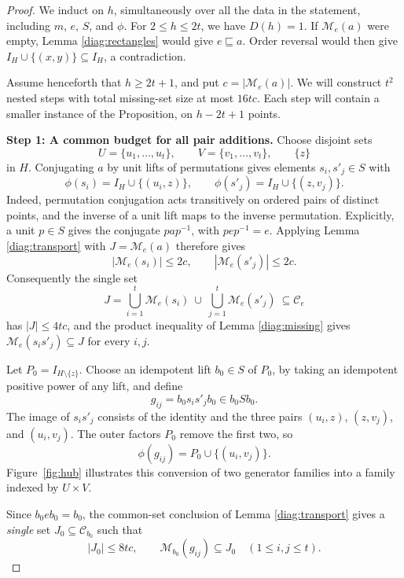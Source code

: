 \begin{proof}
We induct on $h$, simultaneously over all the data in the
statement, including $m$, $e$, $S$, and $\phi$.
For $2\leq h\leq2t$, we have $D(h)=1$.
If $\mathcal M_e(a)$ were empty, Lemma
\ref{diag:rectangles} would give $e\sqsubseteq a$.
Order reversal would then give
$I_H\cup\{(x,y)\}\subseteq I_H$, a contradiction.

Assume henceforth that $h\geq2t+1$, and put
$c=|\mathcal M_e(a)|$.  We will construct $t^2$ nested steps
with total missing-set size at most $16tc$.  Each step will
contain a smaller instance of the Proposition, on $h-2t+1$
points.

\medskip
\noindent\textbf{Step 1: A common budget for all pair additions.}
Choose disjoint sets
\[
 U=\{u_1,\ldots,u_t\},\qquad
 V=\{v_1,\ldots,v_t\},\qquad \{z\}
\]
in $H$.  Conjugating $a$ by unit lifts of permutations gives
elements $s_i,s'_j\in S$ with
\begin{equation}
 \phi(s_i)=I_H\cup\{(u_i,z)\},\qquad
 \phi(s'_j)=I_H\cup\{(z,v_j)\}.
 \label{amp:hub}
\end{equation}
Indeed, permutation conjugation acts transitively on ordered
pairs of distinct points, and the inverse of a unit lift maps
to the inverse permutation.  Explicitly, a unit $p\in S$
gives the conjugate $pap^{-1}$, with $pep^{-1}=e$.
Applying Lemma \ref{diag:transport} with
$J=\mathcal M_e(a)$ therefore gives
\[
 |\mathcal M_e(s_i)|\leq2c,\qquad
 |\mathcal M_e(s'_j)|\leq2c.
\]
Consequently the single set
\[
 J=\bigcup_{i=1}^t\mathcal M_e(s_i)
       \ \cup\ \bigcup_{j=1}^t\mathcal M_e(s'_j)
       \ \subseteq\mathcal C_e
\]
has $|J|\leq4tc$, and the product inequality of Lemma
\ref{diag:missing} gives
$\mathcal M_e(s_i s'_j)\subseteq J$ for every $i,j$.

Let $P_0=I_{H\setminus\{z\}}$.  Choose an idempotent lift
$b_0\in S$ of $P_0$, by taking an idempotent positive power
of any lift, and define
\[
 g_{ij}=b_0s_i s'_j b_0\in b_0Sb_0.
\]
The image of $s_i s'_j$ consists of the identity and the three
pairs $(u_i,z)$, $(z,v_j)$, and $(u_i,v_j)$.
The outer factors $P_0$ remove the first two, so
\begin{equation}
 \phi(g_{ij})=P_0\cup\{(u_i,v_j)\}.
 \label{amp:pair-image}
\end{equation}
Figure~\ref{fig:hub} illustrates this conversion of two generator
families into a family indexed by $U\times V$.



Since $b_0eb_0=b_0$, the common-set conclusion of Lemma
\ref{diag:transport} gives a \emph{single} set
$J_0\subseteq\mathcal C_{b_0}$ such that
\begin{equation}
 |J_0|\leq8tc,\qquad
 \mathcal M_{b_0}(g_{ij})\subseteq J_0
 \quad(1\leq i,j\leq t).
 \label{amp:common-budget}
\end{equation}


\end{proof}
